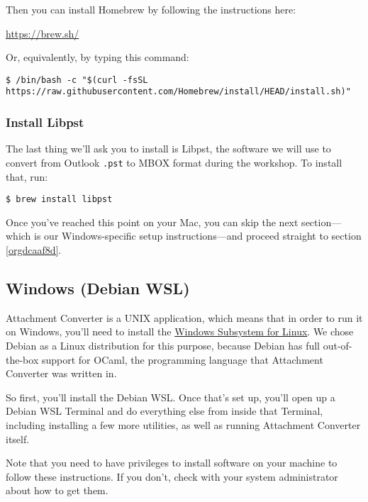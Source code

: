 \documentclass[11pt]{article}
\begin{document}
Then you can install Homebrew by following the instructions here:

\url{https://brew.sh/}

Or, equivalently, by typing this command:

\footnotesize

\begin{verbatim}
$ /bin/bash -c "$(curl -fsSL https://raw.githubusercontent.com/Homebrew/install/HEAD/install.sh)"
\end{verbatim}

\normalsize

\subsubsection{Install Libpst}
\label{sec:orgfc904cc}

The last thing we'll ask you to install is Libpst, the software we
will use to convert from Outlook \texttt{.pst} to MBOX format during the
workshop.  To install that, run:

\begin{verbatim}
$ brew install libpst
\end{verbatim}

Once you've reached this point on your Mac, you can skip the next
section---which is our Windows-specific setup instructions---and
proceed straight to section \ref{orgdcaaf8d}.

\subsection{Windows (Debian WSL) \label{org1a1609b}}
\label{sec:orgb50ac65}

Attachment Converter is a UNIX application, which means that in order
to run it on Windows, you'll need to install the \href{https://en.wikipedia.org/wiki/Windows\_Subsystem\_for\_Linux}{Windows Subsystem for
Linux}.  We chose Debian as a Linux distribution for this purpose,
because Debian has full out-of-the-box support for OCaml, the
programming language that Attachment Converter was written in.

So first, you'll install the Debian WSL.  Once that's set up, you'll
open up a Debian WSL Terminal and do everything else from inside that
Terminal, including installing a few more utilities, as well as
running Attachment Converter itself.

Note that you need to have privileges to install software on your
machine to follow these instructions.  If you don't, check with your
system administrator about how to get them.
\end{document}

